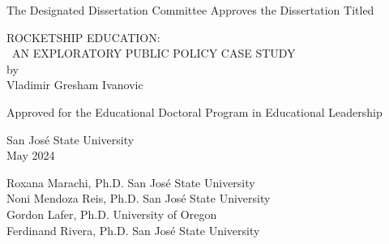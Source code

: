 
\thispagestyle{empty}

\begin{center}
The Designated Dissertation Committee Approves the Dissertation Titled\\
\vspace{2\baselineskip}

\SingleSpacing%
ROCKETSHIP EDUCATION:\\
~AN EXPLORATORY PUBLIC POLICY CASE STUDY\\
\DoubleSpacing%
by\\
Vladimir Gresham Ivanovic\\
\vspace{2\baselineskip}

Approved for the Educational Doctoral Program in Educational Leadership\\
\vspace{2\baselineskip}

San José State University\\
\vspace{2\baselineskip}
May 2024\\
\vspace{3\baselineskip}
\end{center}

Roxana Marachi, Ph.D. \hfill{} San José State University\\

Noni Mendoza Reis, Ph.D.\hfill{} San José State University\\

Gordon Lafer, Ph.D.\hfill{} University of Oregon\\

Ferdinand Rivera, Ph.D.\hfill{} San José State University\\

